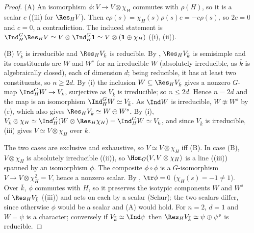 \begin{proof}
(A) An isomorphism $\phi\colon V\to V\otimes\chi_H$ commutes with $\rho(H)$, so it is a scalar $c$ ((iii) for $\Res_HV$). Then
$c\rho(s)=\chi_H(s)\rho(s)c=-c\rho(s)$, so $2c=0$ and $c=0$, a contradiction. The induced statement is
$\Ind_H^G\Res_HV\simeq V\otimes\Ind_H^G\mathbf1\simeq V\otimes(\mathbf1\oplus\chi_H)$ ((i), (ii)).

(B) $V_{\bar k}$ is irreducible and $\Res_HV_{\bar k}$ is reducible. By , $\Res_HV_{\bar k}$ is semisimple and its constituents are
$W$ and $W^s$ for an irreducible $W$ (absolutely irreducible, as $\bar k$ is algebraically closed), each of dimension $d$; being reducible, it
has at least two constituents, so $n\ge2d$. By (i) the inclusion $W\subseteq\Res_HV_{\bar k}$ gives a nonzero $G$-map
$\Ind_H^GW\to V_{\bar k}$, surjective as $V_{\bar k}$ is irreducible; so $n\le2d$. Hence $n=2d$ and the map is an isomorphism $\Ind_H^GW\simeq V_{\bar k}$. As
$\Ind W$ is irreducible, $W\not\simeq W^s$ by (c), which also gives $\Res_HV_{\bar k}\simeq W\oplus W^s$. By
(i), $V_{\bar k}\otimes\chi_H\simeq\Ind_H^G(W\otimes\Res_H\chi_H)=\Ind_H^GW\simeq V_{\bar k}$, and since $V_{\bar k}$ is irreducible,
(iii) gives $V\simeq V\otimes\chi_H$ over $k$.

The two cases are exclusive and exhaustive, so $V\simeq V\otimes\chi_H$ iff (B). In case (B), $V\otimes\chi_H$ is absolutely irreducible
((ii)), so $\Hom_G(V,V\otimes\chi_H)$ is a line ((iii)) spanned by an isomorphism $\phi$. The composite
$\phi\circ\phi$ is a $G$-isomorphism $V\to V\otimes\chi_H^2=V$, hence a nonzero scalar. By , $\tr\phi=0$ ($\chi_H(s)=-1\ne1$). Over
$\bar k$, $\phi$ commutes with $H$, so it preserves the isotypic components $W$ and $W^s$ of $\Res_HV_{\bar k}$ ((iii)) and acts on
each by a scalar (Schur); the two scalars differ, since otherwise $\phi$ would be a scalar and (A) would hold. For $n=2$, $d=1$ and $W=\psi$ is a
character; conversely if $V_{\bar k}\simeq\Ind\psi$ then $\Res_HV_{\bar k}\simeq\psi\oplus\psi^s$ is reducible.
\end{proof}

